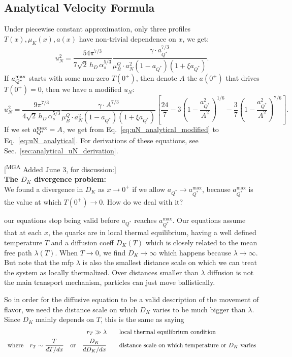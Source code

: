 \documentclass[11pt]{article}
\newcommand{\mgacom}[1]{\textsf{\color[rgb]{0.75,0,0}[\textsuperscript{MGA} #1]}}
\newcommand{\la}{\lambda}
\newcommand{\aQstar}{{\ensuremath{a_{Q^*}}}}
\newcommand{\aQstarmax}{{\ensuremath{a_{Q^*}^\text{max}}}}
\begin{document}
\subsection{Analytical Velocity Formula}
Under piecewise constant approximation, only three profiles $T(x), \mu_K(x), a(x)$ have non-trivial dependence on $x$, we get:
\begin{equation}
u_N^2
=
\frac{
54\pi^{7/3}
}{
7\sqrt{2}\,h_D\,\alpha_s^{5/3}
}
\frac{\gamma\cdot 
a_{Q^*}^{7/3}
}{
\mu_B^Q\cdot  a_N^2(1-a_{Q^*})(1+\xi a_{Q^*})
}.
\label{eq:uN_analytical}
\end{equation}
If $a_{Q^*}^{\rm max}$ starts with some non-zero $T(0^+)$, then denote $A$ the $a(0^+)$ that drives $T(0^+) = 0$, then we have a modified $u_N$:
\begin{equation}
u_N^2
=
\frac{
9\pi^{7/3}
}{
4\sqrt{2}\,h_D\,\alpha_s^{5/3}
}
\frac{
\gamma\cdot A^{7/3}
}{
\mu^Q_B\cdot a_N^2(1-a_{Q^*})(1+\xi a_{Q^*})
}
\left[
\frac{24}{7}
-3\left(1-\frac{a_{Q^*}^2}{A^2}\right)^{1/6}
-\frac{3}{7}
\left(1-\frac{a_{Q^*}^2}{A^2}\right)^{7/6}
\right].
\label{eq:uN_analytical_modified}
\end{equation}
If we set $a_{Q^*}^{\rm max} = A$, we get from Eq.~\eqref{eq:uN_analytical_modified} to Eq.~\eqref{eq:uN_analytical}. For derivations of these equations, see Sec.~\ref{sec:analytical_uN_derivation}.

\newpage\noindent
\mgacom{Added June 3, for discussion:}\\
{\bf The $D_K$ divergence problem:}\\
We found a divergence in $D_K$ as $x\to 0^+$ if we allow $\aQstar \to \aQstarmax$, because $\aQstarmax$ is the value at which $T(0^+)\to 0$. How do we deal with it?

\medskip{} our equations stop being valid before $\aQstar$ reaches $\aQstarmax$.
Our equations assume that at each $x$, the quarks are in local thermal equilibrium, having a well defined temperature $T$ and a diffusion coeff $D_K(T)$ which is closely related to the mean free path $\la(T)$. When $T\to 0$, we find $D_K\to\infty$ which happens because $\la\to\infty$. 
But note that the mfp $\la$ is also the smallest distance scale on which we can treat the system as locally thermalized. Over distances smaller than $\la$ diffusion is not the main transport mechanism, particles can just move ballistically.

So in order for the diffusive equation to be a valid description of the movement of flavor, we need the distance scale on which $D_K$ varies to be much bigger than $\la$. Since $D_K$ mainly depends on $T$, this is the same as saying 
\begin{equation} \begin{array}{r@{\qquad}l}
r_T \gg \la & \text{local thermal equilibrium condition} \\[1ex] 
\text{where}\quad
r_T \sim \dfrac{T}{dT/dx}\quad\text{or}\quad 
\dfrac{D_K}{dD_K/dx} & \text{distance scale on which temperature or $D_K$ varies}
\end{array}
\end{equation}
\end{document}
